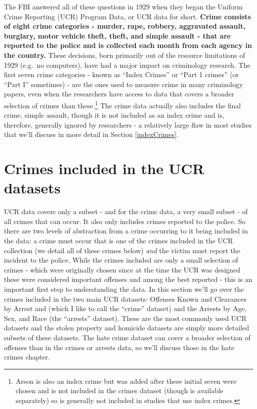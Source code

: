 \documentclass[
  12pt,
  openany]{book}
\begin{document}
The FBI answered all of these questions in 1929 when they began the Uniform Crime Reporting (UCR) Program Data, or UCR data for short. \textbf{Crime consists of eight crime categories - murder, rape, robbery, aggravated assault, burglary, motor vehicle theft, theft, and simple assault - that are reported to the police and is collected each month from each agency in the country.} These decisions, born primarily out of the resource limitations of 1929 (e.g.~no computers), have had a major impact on criminology research. The first seven crime categories - known as ``Index Crimes'' or ``Part 1 crimes'' (or ``Part I'' sometimes) - are the ones used to measure crime in many criminology papers, even when the researchers have access to data that covers a broader selection of crimes than these.\footnote{Arson is also an index crime but was added after these initial seven were chosen and is not included in the crimes dataset (though is available separately) so is generally not included in studies that use index crimes.} The crime data actually also includes the final crime, simple assault, though it is not included as an index crime and is, therefore, generally ignored by researchers - a relatively large flaw in most studies that we'll discuss in more detail in Section \ref{indexCrimes}.

\hypertarget{crimes-included-in-the-ucr-datasets}{%
\section{Crimes included in the UCR datasets}\label{crimes-included-in-the-ucr-datasets}}

UCR data covers only a subset - and for the crime data, a very small subset - of all crimes that can occur. It also only includes crimes reported to the police. So there are two levels of abstraction from a crime occurring to it being included in the data: a crime must occur that is one of the crimes included in the UCR collection (we detail all of these crimes below) \emph{and} the victim must report the incident to the police. While the crimes included are only a small selection of crimes - which were originally chosen since at the time the UCR was designed these were considered important offenses and among the best reported - this is an important first step to understanding the data. In this section we'll go over the crimes included in the two main UCR datasets: Offenses Known and Clearances by Arrest and (which I like to call the ``crime'' dataset) and the Arrests by Age, Sex, and Race (the ``arrests'' dataset). These are the most commonly used UCR datasets and the stolen property and homicide datasets are simply more detailed subsets of these datasets. The hate crime dataset can cover a broader selection of offenses than in the crimes or arrests data, so we'll discuss those in the hate crimes chapter.
\end{document}
